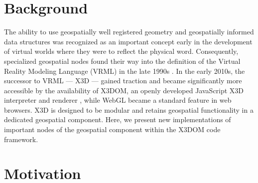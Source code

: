 \documentclass{acmsiggraph}                     %
\begin{document}

\begin{CRcatlist}  \end{CRcatlist}

\keywordlist

\section{Background}


\copyrightspace

The ability to use geospatially well registered geometry and geospatially informed data structures
was recognized as an important concept early in the development of virtual worlds where they were to
reflect the physical word. Consequently, specialized geospatial nodes found their way into the
definition of the Virtual Reality Modeling Language (VRML) in the late 1990s \cite{reddy2000}. In
the early 2010s, the successor to VRML --- X3D --- gained traction and became significantly more
accessible by the availability of X3DOM, an openly developed JavaScript X3D interpreter and renderer
\cite{behr09}, while WebGL became a standard feature in web browsers. X3D is designed to be modular
\cite{x3d05} and retains geospatial functionality in a dedicated geospatial component. Here, we
present new implementations of important nodes of the geospatial component within the X3DOM code
framework.


\section{Motivation}
\end{document}
